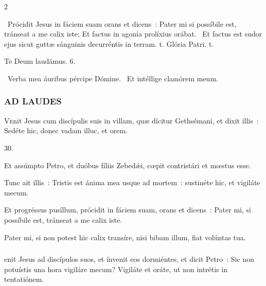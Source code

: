 \documentclass[9pt,twoside]{extarticle}
\begin{document}
\begin{multicols}{2}
\begin{tightlist}{}
\item \item {}~Prócidit Jesus in fáciem suam orans et dicens~: Pater mi si possíbile est, tránseat a me calix iste; \textred{*} Et factus in agonía prolíxius orábat. ~Et factus est sudor ejus sicut guttæ sánguinis decurréntis in terram. t. Glória Patri. t.
\item Te Deum laudámus. 6.
\item {}~Verba mea áuribus pércipe Dómine. ~Et intéllige clamórem meum.
\end{tightlist}

\subsubsection*{\center \textsc{AD LAUDES}}
\begin{center}\end{center}
\lettrine{V}enit Jesus cum discípulis suis in villam, quæ dícitur Gethsémani, et dixit illis~: Sedéte hic, donec vadam illuc, et orem.

\begin{tightlist}{}
\item {} 30.
\item {} Et assúmpto Petro, et duóbus fíliis Zebedǽi, cœpit contristári et mœstus esse.
\item {} Tunc ait illis~: Tristis est ánima mea usque ad mortem~: sustinéte hic, et vigiláte mecum.
\item {} Et progréssus pusíllum, prócidit in fáciem suam, orans et dicens~: Pater mi, si possíbile est, tránseat a me calix iste.
\item {} Pater mi, si non potest hic calix transíre, nisi bibam illum, fiat volúntas tua.
\end{tightlist}
\subsubsection*{}
enit Jesus ad discípulos suos, et ínvenit eos dormiéntes, et dicit Petro~: Sic non potuístis una hora vigiláre mecum? Vigiláte et oráte, ut non intrétis in tentatiónem.


\end{multicols}
\end{document}
